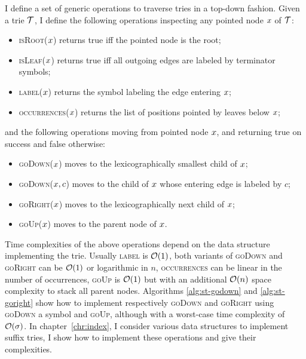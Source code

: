 I define a set of generic operations to traverse tries in a top-down fashion.
Given a trie $\mathcal {T}$, I define the following operations inspecting any pointed node $x$ of $\mathcal {T}$:
\begin{itemize}
\item \textsc{isRoot}($x$) returns true iff the pointed node is the root;
\item \textsc{isLeaf}($x$) returns true iff all outgoing edges are labeled by terminator symbols;
\item \textsc{label}($x$) returns the symbol labeling the edge entering $x$;
\item \textsc{occurrences}($x$) returns the list of positions pointed by leaves below $x$;
\end{itemize}
and the following operations moving from pointed node $x$, and returning true on success and false otherwise:
\begin{itemize}
\item \textsc{goDown}($x$) moves to the lexicographically smallest child of $x$;
\item \textsc{goDown}($x, c$) moves to the child of $x$ whose entering edge is labeled by $c$;
\item \textsc{goRight}($x$) moves to the lexicographically next child of $x$;
\item \textsc{goUp}($x$) moves to the parent node of $x$.
\end{itemize}

Time complexities of the above operations depend on the data structure implementing the trie.
Usually \textsc{label} is $\mathcal{O}(1)$, both variants of \textsc{goDown} and \textsc{goRight} can be $\mathcal{O}(1)$ or logarithmic in $n$, \textsc{occurrences} can be linear in the number of occurrences, \textsc{goUp} is $\mathcal{O}(1)$ but with an additional $\mathcal{O}(n)$ space complexity to stack all parent nodes.
Algorithms \ref{alg:st-godown} and \ref{alg:st-goright} show how to implement respectively \textsc{goDown} and \textsc{goRight} using \textsc{goDown} a symbol and \textsc{goUp}, although with a worst-case time complexity of $\mathcal{O}(\sigma)$.
In chapter~\ref{chr:index}, I consider various data structures to implement suffix tries, I show how to implement these operations and give their complexities.

